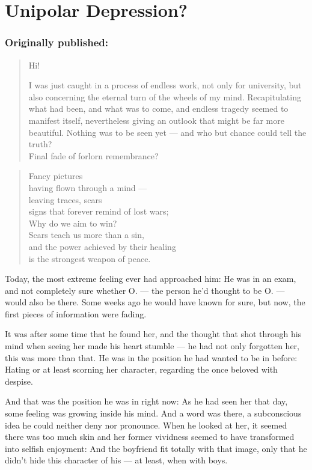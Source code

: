 \chapter{Unipolar Depression?}
\label{cha:unipolar-depression}
\subsection*{Originally published: }
\begin{quote}
Hi! 

I was just caught in a process of endless work, not only for university, but also concerning the eternal turn of the wheels of my mind. Recapitulating what had been, and what was to come, and endless tragedy seemed to manifest itself, nevertheless giving an outlook that might be far more beautiful. Nothing was to be seen yet --- and who but chance could tell the truth?\\
Final fade of forlorn remembrance?
\end{quote}

\begin{quote}
Fancy pictures \\
having flown through a mind --- \\
leaving traces, scars \\
signs that forever remind of lost wars; \\
Why do we aim to win? \\
Scars teach us more than a sin, \\
and the power achieved by their healing \\
is the strongest weapon of peace.
\end{quote}
Today, the most extreme feeling ever had approached him: He was in an exam, and not completely sure whether O. --- the person he'd thought to be O. --- would also be there. Some weeks ago he would have known for sure, but now, the first pieces of information were fading.

It was after some time that he found her, and the thought that shot through his mind when seeing her made his heart stumble --- he had not only forgotten her, this was more than that. 
He was in the position he had wanted to be in before: Hating or at least scorning her character, regarding the once beloved with despise.

And that was the position he was in right now: As he had seen her that day, some feeling was growing inside his mind. And a word was there, a subconscious idea he could neither deny nor pronounce. 
When he looked at her, it seemed there was too much skin and her former vividness seemed to have transformed into selfish enjoyment: And the boyfriend fit totally with that image, only that he didn't hide this character of his --- at least, when with boys.


